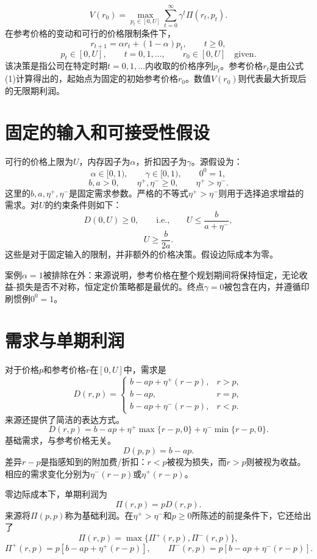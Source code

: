 \documentclass{article}
\begin{document}
\begin{equation}
V(r_0)=\max_{p_t\in[0,U]}\sum_{t=0}^{\infty}\gamma^t\Pi(r_t,p_t).
\tag{3}
\end{equation}
在参考价格的变动和可行的价格限制条件下，
\begin{equation}
r_{t+1}=\alpha r_t+(1-\alpha)p_t,\qquad t\geq 0,
\tag{1}
\end{equation}
\[
p_t\in[0,U],\qquad t=0,1,\ldots,
\qquad r_0\in[0,U]\quad\text{given}.
\]
该决策是指公司在特定时期$t=0,1,\ldots$内收取的价格序列$p_t$。参考价格$r_t$是由公式(1)计算得出的，起始点为固定的初始参考价格$r_0$。数值$V(r_0)$则代表最大折现后的无限期利润。

\section*{固定的输入和可接受性假设}
可行的价格上限为$U$，内存因子为$\alpha$，折扣因子为$\gamma$。源假设为：
\[
\alpha\in[0,1),\qquad \gamma\in[0,1),\qquad 0^0=1,
\]
\[
b,a>0,\qquad \eta^+,\eta^-\geq 0,\qquad \eta^+>\eta^-.
\]
这里的$b,a,\eta^+,\eta^-$是固定需求参数。严格的不等式$\eta^+>\eta^-$则用于选择追求增益的需求。对$U$的约束条件则如下：
\[
D(0,U)\geq 0,\qquad\text{i.e.,}\qquad U\leq\frac{b}{a+\eta^-},
\]
\[
U\geq\frac{b}{2a}.
\]
这些是对于固定输入的限制，并非额外的价格决策。假设边际成本为零。

案例$\alpha=1$被排除在外：来源说明，参考价格在整个规划期间将保持恒定，无论收益-损失是否不对称，恒定定价策略都是最优的。终点$\gamma=0$被包含在内，并遵循印刷惯例$0^0=1$。

\section*{需求与单期利润}
对于价格$p$和参考价格$r$在$[0,U]$中，需求是
\begin{equation}
D(r,p)=
\begin{cases}
b-ap+\eta^+(r-p),&r>p,\\
b-ap,&r=p,\\
b-ap+\eta^-(r-p),&r<p.
\end{cases}
\tag{2}
\end{equation}
来源还提供了简洁的表达方式。
\[
D(r,p)=b-ap+\eta^+\max\{r-p,0\}+\eta^-\min\{r-p,0\}.
\]
基础需求，与参考价格无关。
\[
D(p,p)=b-ap.
\]
差异$r-p$是指感知到的附加费/折扣：$r<p$被视为损失，而$r>p$则被视为收益。相应的需求变化分别为$\eta^-(r-p)$或$\eta^+(r-p)$。

零边际成本下，单期利润为
\[
\Pi(r,p)=pD(r,p).
\]
来源将$\Pi(p,p)$称为基础利润。在$\eta^+>\eta^-$和$p\geq 0$所陈述的前提条件下，它还给出了
\[
\Pi(r,p)=\max\{\Pi^+(r,p),\Pi^-(r,p)\},
\]
\[
\Pi^+(r,p)=p[b-ap+\eta^+(r-p)],\qquad
\Pi^-(r,p)=p[b-ap+\eta^-(r-p)].
\]
\end{document}
